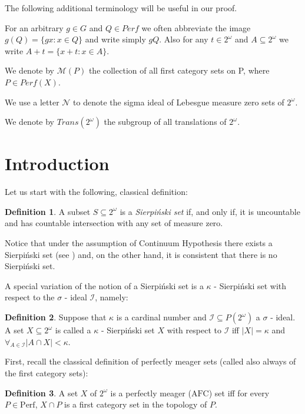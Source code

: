 \documentclass[b5cutpaper, twoside, 11pt, leqno]{moravica}
\newcommand{\calI}{\mathcal{I}}
\newcommand{\afc}{\mathrm{AFC}}
\newcommand\trans{\mathit{Trans}(\ca)}
\newcommand{\ca}{2^{\omega}}
\newcommand{\mgr}{\mathcal{M}}
\newcommand{\neglig}{\mathcal{N}}
\newcommand{\perf}{\mathit{Perf}}
\newcommand{\cantor}{\ca}
\newcommand{\Perf}{\mathrm{Perf}}
\theoremstyle{definition}
\newtheorem{definition}{Definition}[section]
\begin{document}
The following additional terminology will be useful in our proof.

  For an arbitrary $g\in G$ and $Q \in \perf$
we often abbreviate the image $g(Q) = \lbrace gx: x\in Q \rbrace$
and write simply $gQ$. Also for any $t\in\cantor$ and
$A \subseteq \cantor$ we write
$A + t = \lbrace x + t \colon x \in A \rbrace$.

  We denote by $\mgr(P)$ the collection of all
first category sets on P, where $P \in Perf(X)$.

  We use a letter $\neglig$ to denote
the sigma ideal of Lebesgue measure zero sets of $2^\omega$.

  We denote by $\trans$ the subgroup of all
translations of $\cantor$. 

\section{Introduction} 


  Let us start with the following, classical definition:
\begin{definition}
  A subset $S \subseteq \cantor$ is a {\it Sierpi\'nski set}
if, and only if, it is uncountable and has countable intersection with
any set of measure zero. 
\end{definition}

Notice that under the assumption
of Continuum Hypothesis there exists a Sierpi\'nski set (see \cite{Si})
and, on the other hand, it is consistent that there is no Sierpi\'nski set.

A special variation of the notion of a Sierpi\'nski set
is a $\kappa$ - Sierpi\'nski set with respect to the
$\sigma$ - ideal $\calI$, namely:
\begin{definition}
\label{kappaSierp}
Suppose that $\kappa$ is a cardinal number 
and $\calI \subseteq P(\cantor)$ a $\sigma$ - ideal.
A set $X \subseteq\cantor$ is called 
a $\kappa$ - Sierpi\'nski set $X$ with
respect to $\calI$ iff
$|X| = \kappa$ and $\forall_{A \in \calI} |A \cap X| < \kappa$.
\end{definition}

First, recall the classical definition of perfectly meager sets 
(called also always of the first category sets):
\begin{definition}
A set $X$ of $\cantor$ is a perfectly meager ($\afc$) set
iff for every $P\in \Perf$, $X\cap P$ is a first category set
in the topology of $P$.
\end{definition}
\end{document}
